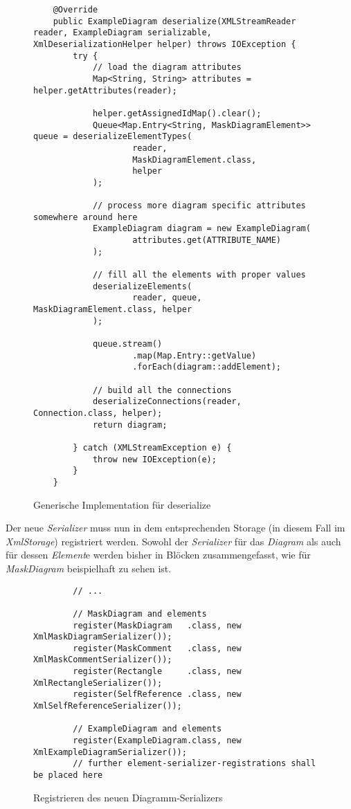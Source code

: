 \begin{figure}[H]
	\centering
	\begin{lstlisting}
    @Override
    public ExampleDiagram deserialize(XMLStreamReader reader, ExampleDiagram serializable, XmlDeserializationHelper helper) throws IOException {
        try {
            // load the diagram attributes
            Map<String, String> attributes = helper.getAttributes(reader);

            helper.getAssignedIdMap().clear();
            Queue<Map.Entry<String, MaskDiagramElement>> queue = deserializeElementTypes(
                    reader,
                    MaskDiagramElement.class,
                    helper
            );

            // process more diagram specific attributes somewhere around here
            ExampleDiagram diagram = new ExampleDiagram(
                    attributes.get(ATTRIBUTE_NAME)
            );

            // fill all the elements with proper values
            deserializeElements(
                    reader, queue, MaskDiagramElement.class, helper
            );
            
            queue.stream()
                    .map(Map.Entry::getValue)
                    .forEach(diagram::addElement);

            // build all the connections
            deserializeConnections(reader, Connection.class, helper);
            return diagram;

        } catch (XMLStreamException e) {
            throw new IOException(e);
        }
    }
	\end{lstlisting}
	\caption{Generische Implementation für deserialize}
\end{figure}

Der neue \textit{Serializer} muss nun in dem entsprechenden Storage (in diesem Fall im \textit{XmlStorage}) registriert
werden. Sowohl der \textit{Serializer} für das \textit{Diagram} als auch für dessen \textit{Element}e werden bisher in
Blöcken zusammengefasst, wie für \textit{MaskDiagram} beispielhaft zu sehen ist.

\begin{figure}[H]
	\centering
	\begin{lstlisting}
	    // ...
	
        // MaskDiagram and elements
        register(MaskDiagram   .class, new XmlMaskDiagramSerializer());
        register(MaskComment   .class, new XmlMaskCommentSerializer());
        register(Rectangle     .class, new XmlRectangleSerializer());
        register(SelfReference .class, new XmlSelfReferenceSerializer());
        
        // ExampleDiagram and elements
        register(ExampleDiagram.class, new XmlExampleDiagramSerializer());
        // further element-serializer-registrations shall be placed here
	\end{lstlisting}
	\caption{Registrieren des neuen Diagramm-Serializers}
\end{figure}


